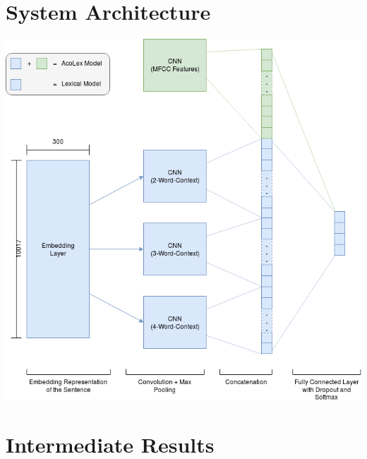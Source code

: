\documentclass[a0,landscape]{a0poster}
\begin{document}
\begin{multicols}{3}

\section*{System Architecture}
\includegraphics[width=0.9\linewidth]{Bilder/CNN_Diagram.png}


\color{Black} %
\large

\section*{Intermediate Results}

\begin{tabular}{c | c |c | c | c | c | c | c }
	

\end{tabular}
\end{multicols}
\end{document}
